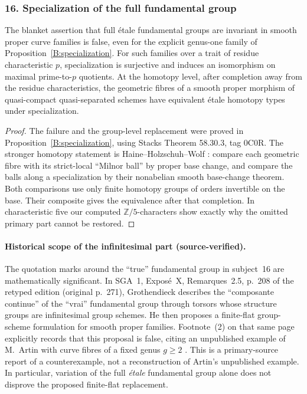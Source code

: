 \subsubsection{16. Specialization of the full fundamental group}
\begin{corollary}\label{B:subject16}
The blanket assertion that full \'etale fundamental groups are invariant in smooth proper curve families is false, even for the explicit genus-one family of Proposition~\ref{B:specialization}. For such families over a trait of residue characteristic $p$, specialization is surjective and induces an isomorphism on maximal prime-to-$p$ quotients. At the homotopy level, after completion away from the residue characteristics, the geometric fibres of a smooth proper morphism of quasi-compact quasi-separated schemes have equivalent \'etale homotopy types under specialization.
\end{corollary}
\begin{proof}
The failure and the group-level replacement were proved in Proposition~\ref{B:specialization}, using Stacks Theorem 58.30.3, tag 0C0R. The stronger homotopy statement is Haine--Holzschuh--Wolf \cite[Proposition 2.49]{BHHW2024}: compare each geometric fibre with its strict-local ``Milnor ball'' by proper base change, and compare the balls along a specialization by their nonabelian smooth base-change theorem. Both comparisons use only finite homotopy groups of orders invertible on the base. Their composite gives the equivalence after that completion. In characteristic five our computed $\mathbb Z/5$-characters show exactly why the omitted primary part cannot be restored.
\end{proof}

\paragraph{Historical scope of the infinitesimal part (source-verified).}
The quotation marks around the ``true'' fundamental group in subject~16
are mathematically significant.  In SGA~1, Expos\'e~X, Remarques~2.5,
p.~208 of the retyped edition (original p.~271), Grothendieck describes
the ``composante continue'' of the ``vrai'' fundamental group through
torsors whose structure groups are infinitesimal group schemes.
He then proposes a finite-flat group-scheme formulation for smooth
proper families.  Footnote~(2) on that same page explicitly records
that this proposal is false, citing an unpublished example of M.~Artin
with curve fibres of a fixed genus $g\geq2$
\cite{A567_SGA1_2003}.  This is a primary-source report of a
counterexample, not a reconstruction of Artin's unpublished example.
In particular, variation of the full \emph{\'etale} fundamental group
alone does not disprove the proposed finite-flat replacement.

